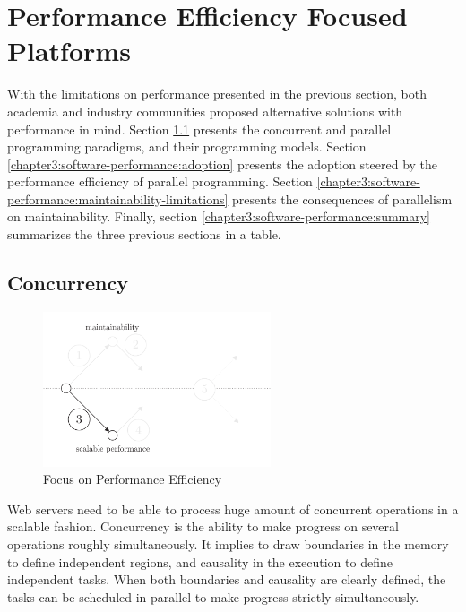 \section{Performance Efficiency Focused Platforms} \label{chapter3:software-performance}

With the limitations on performance presented in the previous section, both academia and industry communities proposed alternative solutions with performance in mind.
Section \ref{chapter3:software-performance:concurrency} presents the concurrent and parallel programming paradigms, and their programming models. %
Section \ref{chapter3:software-performance:adoption} presents the adoption steered by the performance efficiency of parallel programming.
Section \ref{chapter3:software-performance:maintainability-limitations} presents the consequences of parallelism on maintainability.
Finally, section \ref{chapter3:software-performance:summary} summarizes the three previous sections in a table.

\subsection{Concurrency} \label{chapter3:software-performance:concurrency}

\begin{figure}[!h]
\begin{center}
\includegraphics[width=0.6\textwidth]{../ressources/state-of-the-art-3.pdf}
\end{center}
\caption{Focus on Performance Efficiency}
\label{fig:state-of-the-art-3}
\end{figure}

Web servers need to be able to process huge amount of concurrent operations in a scalable fashion.
Concurrency is the ability to make progress on several operations roughly simultaneously.
It implies to draw boundaries in the memory to define independent regions, and causality in the execution to define independent tasks.
When both boundaries and causality are clearly defined, the tasks can be scheduled in parallel to make progress strictly simultaneously.

